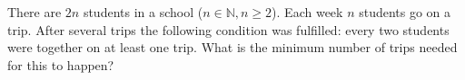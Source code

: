 \documentclass{article}
\begin{document}
\setlength{\parindent}{0pt}
There are \( 2n \) students in a school (\( n \in \mathbb{N}, n \geq 2 \)). Each week \( n \) students go on a trip. After several trips the following condition was fulfilled: every two students were together on at least one trip. What is the minimum number of trips needed for this to happen?
\end{document}

